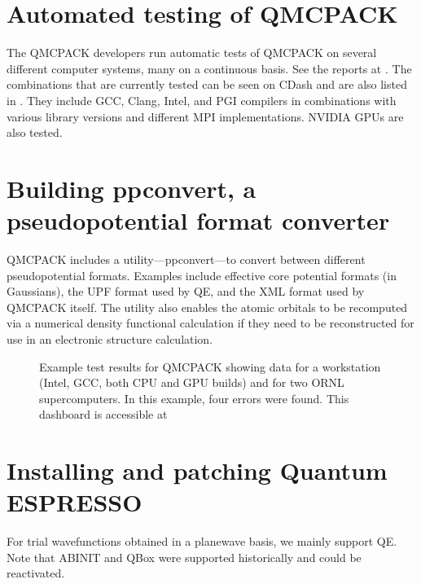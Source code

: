 \documentclass[letterpaper,10pt,english]{sphinxmanual}
\begin{document}
\section{Automated testing of QMCPACK}
\label{\detokenize{installation:automated-testing-of-qmcpack}}
The QMCPACK developers run automatic tests of QMCPACK on several
different computer systems,  many on a continuous basis. See the reports at
.
The combinations that are currently tested can be seen on CDash and are also listed in
. They include GCC, Clang, Intel, and PGI compilers in combinations
with various library versions and different MPI implementations. NVIDIA GPUs are also tested.


\section{Building ppconvert, a pseudopotential format converter}
\label{\detokenize{installation:building-ppconvert-a-pseudopotential-format-converter}}\label{\detokenize{installation:buildppconvert}}
QMCPACK includes a utility—ppconvert—to convert between different
pseudopotential formats. Examples include effective core potential
formats (in Gaussians), the UPF format used by QE, and
the XML format used by QMCPACK itself. The utility also enables the
atomic orbitals to be recomputed via a numerical density functional
calculation if they need to be reconstructed for use in an
electronic structure calculation.

\begin{figure}[htbp]
\centering
\capstart

\noindent{}
\caption{Example test results for QMCPACK showing data for a
workstation (Intel, GCC, both CPU and GPU builds) and for two ORNL
supercomputers. In this example, four errors were found. This
dashboard is accessible at }\label{\detokenize{installation:id7}}\label{\detokenize{installation:fig2}}\end{figure}


\section{Installing and patching Quantum ESPRESSO}
\label{\detokenize{installation:installing-and-patching-quantum-espresso}}\label{\detokenize{installation:buildqe}}
For trial wavefunctions obtained in a plane\sphinxhyphen{}wave basis, we mainly
support QE. Note that ABINIT and QBox were supported historically
and could be reactivated.
\end{document}
